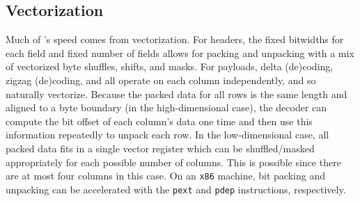 


\subsection{Vectorization}

Much of \mine's speed comes from vectorization. For headers, the fixed bitwidths for each field and fixed number of fields allows for packing and unpacking with a mix of vectorized byte shuffles, shifts, and masks. For payloads, delta (de)coding, zigzag (de)coding, and \fire all operate on each column independently, and so naturally vectorize. Because the packed data for all rows is the same length and aligned to a byte boundary (in the high-dimensional case), the decoder can compute the bit offset of each column's data one time and then use this information repeatedly to unpack each row. In the low-dimensional case, all packed data fits in a single vector register which can be shuffled/masked appropriately for each possible number of columns. This is possible since there are at most four columns in this case. On an \texttt{x86} machine, bit packing and unpacking can be accelerated with the \texttt{pext} and \texttt{pdep} instructions, respectively.
